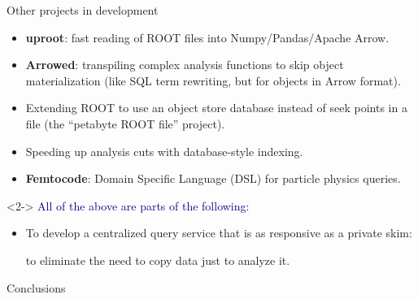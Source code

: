 \documentclass[aspectratio=169]{beamer}
\begin{document}
\begin{frame}{Other projects in development}
\vspace{0.5 cm}
\large
\begin{itemize}\setlength{\itemsep}{0.35 cm}
\item {\bf uproot}: fast reading of ROOT files into Numpy/Pandas/Apache Arrow.
\item {\bf Arrowed}: transpiling complex analysis functions to skip object materialization (like SQL term rewriting, but for objects in Arrow format).
\item Extending ROOT to use an object store database instead of seek points in a file (the ``petabyte ROOT file'' project).
\item Speeding up analysis cuts with database-style indexing.
\item {\bf Femtocode}: Domain Specific Language (DSL) for particle physics queries.
\end{itemize}

\vspace{0.2 cm}
\begin{uncoverenv}<2->
\textcolor{darkblue}{All of the above are parts of the following:}
\begin{itemize}\setlength{\itemsep}{0.5 cm}
\item To develop a centralized query service that is as responsive as a private skim:

to eliminate the need to copy data just to analyze it.
\end{itemize}
\end{uncoverenv}
\end{frame}

\begin{frame}{Conclusions}
\vspace{0.5 cm}
\begin{center}
\hspace{1 cm}
\end{center}
\end{frame}
\end{document}
